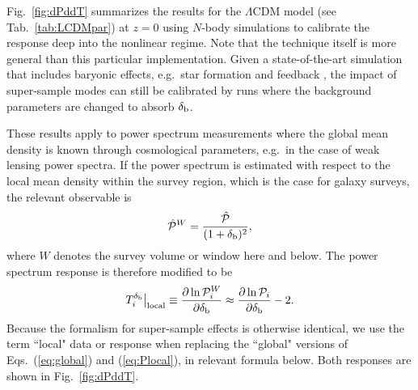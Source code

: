 \documentclass[prd,twocolumn,amsmath,amssymb,floatfix,superscriptaddress]{revtex4-1}
\newcommand{\br}{{\rm b}}
\newcommand{\Dv}{{\cal P}}
\begin{document}
{Fig.~\ref{fig:dPddT} summarizes the results
for the $\Lambda$CDM
model  (see Tab.~\ref{tab:LCDMpar}) at $z=0$ using $N$-body simulations to calibrate the response deep into the nonlinear regime.
    Note that the
technique itself is more general than this particular implementation.  Given a state-of-the-art simulation that includes baryonic effects, e.g.\ star formation and feedback {\cite{Rudd:2007zx,vanDaalenetal:11}}, the impact of super-sample modes can still be calibrated by runs where the background parameters are changed to absorb $\delta_\br$.


These results apply to power spectrum measurements where the global mean density
is known through cosmological parameters, e.g.\ in the case of weak
lensing power spectra.
{If the power spectrum is estimated with respect to the local mean
density within the survey region, which is the case for  galaxy surveys, the relevant
observable is}
\begin{equation}
\hat \Dv^W = \frac{\hat \Dv}{(1+\delta_\br)^2},
\label{eq:Plocal}
\end{equation}
%
{where $W$ denotes the survey volume or window here and below.}
The power spectrum response is therefore modified to be
%
%
\begin{equation}
T^{\delta_\br}_i  \big|_{\rm local} \equiv \frac{\partial \ln \Dv^W_i}{\partial\delta_\br} \approx \frac{\partial\ln \Dv_i}{\partial\delta_\br}-2.
\label{eq:Tlocal}
\end{equation}
Because the formalism for super-sample effects is otherwise identical, we use the
term ``local" data or response when replacing the 
``global" versions of Eqs.~(\ref{eq:global}) and (\ref{eq:Plocal}), in relevant formula below.
{Both responses are shown in Fig.~\ref{fig:dPddT}.}

}
\end{document}
